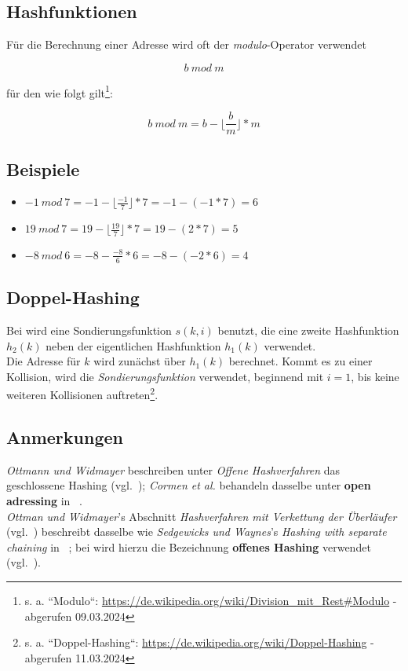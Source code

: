 \subsection{Hashfunktionen}

Für die Berechnung einer Adresse wird oft der \textit{modulo}-Operator verwendet

\begin{equation}
    b\ mod\ m
\end{equation}

\noindent
für den wie folgt gilt\footnote{
s. a. ``Modulo``: \url{https://de.wikipedia.org/wiki/Division_mit_Rest#Modulo} - abgerufen 09.03.2024
}:

\begin{equation}
    b\ mod\ m = b - \lfloor \frac{b}{m} \rfloor * m
\end{equation}

\subsection*{Beispiele}

\begin{itemize}
    \item $-1\ mod\ 7 = -1 - \lfloor \frac{-1}{7} \rfloor * 7 =  -1 - (-1 * 7) = 6$
    \item $19\ mod\ 7 = 19 - \lfloor \frac{19}{7} \rfloor * 7 =  19 - (2 * 7) = 5$
    \item $-8\ mod\ 6 = -8 - \frac{-8}{6} * 6 = -8 - (-2 * 6) = 4$
\end{itemize}

\subsection{Doppel-Hashing}
Bei  wird eine Sondierungsfunktion $s(k, i)$ benutzt, die eine zweite Hashfunktion $h_2(k)$ neben der eigentlichen Hashfunktion $h_1(k)$ verwendet.\\
Die Adresse für $k$ wird zunächst über $h_1(k)$ berechnet.
Kommt es zu einer Kollision, wird die \textit{Sondierungsfunktion} verwendet, beginnend mit $i=1$, bis keine weiteren Kollisionen auftreten\footnote{
s. a. ``Doppel-Hashing``: \url{https://de.wikipedia.org/wiki/Doppel-Hashing} - abgerufen 11.03.2024
}.


\subsection{Anmerkungen}
\textit{Ottmann und Widmayer} beschreiben unter \textit{Offene Hashverfahren} das geschlossene Hashing (vgl.~\cite[203 ff.]{OW17d}); \textit{Cormen et al.} behandeln dasselbe unter \textbf{open adressing} in ~\cite[293 ff.]{CL22}.\\

\noindent
\textit{Ottman und Widmayer}'s Abschnitt  \textit{Hashverfahren mit Verkettung der Überläufer} (vgl.~\cite[198 ff.]{OW17d}) beschreibt dasselbe wie \textit{Sedgewicks und Waynes}'s \textit{Hashing with separate  chaining} in ~\cite[464 ff.]{SW11}; bei  wird hierzu die Bezeichnung  \textbf{offenes Hashing} verwendet (vgl.~\cite[116]{GD18d}).
